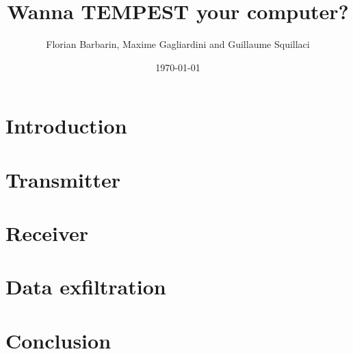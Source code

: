 \documentclass{beamer}
\title{Wanna TEMPEST your computer?}
\author{Florian Barbarin, Maxime Gagliardini and Guillaume Squillaci}
\institute{TLS-SEC}
\date{\today}
\begin{document}
\begin{frame}
\titlepage

%
\end{frame}

\section{Introduction}

	

\section{Transmitter}

	

\section{Receiver}

	
	
\section{Data exfiltration}

	
	
\section{Conclusion}

	
\end{document}
